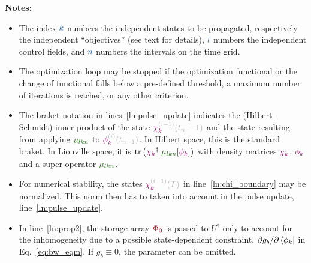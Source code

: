 \documentclass[aps,pra,twocolumn,notitlepage,letterpaper]{revtex4}
\newcommand{\tr}[0]{\operatorname{tr}}
\newcommand{\VarScalar}[1]{{\color{clVarScalar}#1}}
\newcommand{\VarState}[1]{\ensuremath{\textcolor{clVarState}{#1}}}
\newcommand{\PropAnnotation}[1]{\textcolor{black!30}{#1}}
\newcommand{\VarPropState}[4]{\ensuremath{\VarState{#1}_{\textcolor{clVarState}{#2}}^{\PropAnnotation{#3}}\PropAnnotation{(#4)}}}  %
\newcommand{\VarOperator}[2]{{\color{clVarOperator}#1_{#2}}} %
\newcommand{\VarArray}[1]{{\color{clVarArray}#1}}
\begin{document}
\vspace{5pt} \textbf{Notes:}
  \begin{itemize}
    \item The index $\VarScalar{k}$ numbers the independent states to be
      propagated, respectively the independent ``objectives'' (see text for
      details), $\VarScalar{l}$ numbers the independent control fields, and
      $\VarScalar{n}$ numbers the intervals on the time grid.
    \item The optimization loop may be stopped if the optimization functional or
      the change of functional falls below a pre-defined threshold, a maximum
      number of iterations is reached, or any other criterion.
    \item The braket notation in lines~\ref{ln:pulse_update} indicates the
      (Hilbert-Schmidt) inner product of the state
      $\VarPropState{\chi}{k}{(i-1)}{t_n-1}$ and the state
      resulting from applying $\VarOperator{\mu}{lkn}$ to
      $\VarPropState{\phi}{k}{(i)}{t_{n-1}}$.
      In Hilbert space, this is the standard braket.
      In Liouville space, it is $\tr\left(\VarState{\chi_k}^\dagger
      \;\VarOperator{\mu}{lkn}[\VarState{\phi_k}]\right)$ with density
      matrices $\VarState{\chi_k}$, $\VarState{\phi_k}$ and a super-operator
      $\VarOperator{\mu}{lkn}$.
    \item For numerical stability, the states $\VarPropState{\chi}{k}{(i-1)}{T}$
      in line~\ref{ln:chi_boundary} may be normalized. This norm then has to
      taken into account in the pulse update, line~\ref{ln:pulse_update}.
    \item In line~\ref{ln:prop2}, the storage array $\VarArray{\Phi_0}$ is
      passed to $U^\dagger$ only to account for the inhomogeneity due to
      a possible state-dependent constraint, $\partial g_b / \partial
      \bra{\phi_k}$ in Eq.~\eqref{eq:bw_eqm}.
      If $g_b \equiv 0$, the parameter can be omitted.
  \end{itemize}


\end{document}
